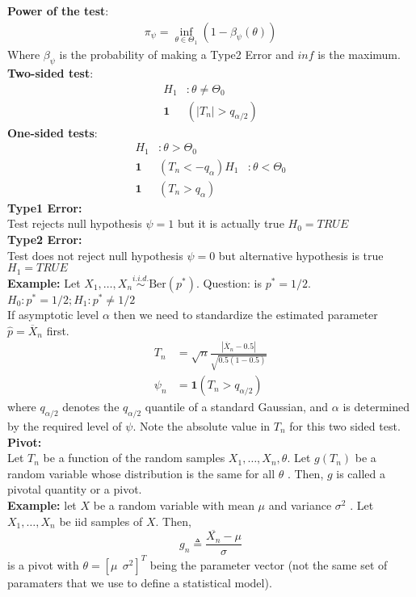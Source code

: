 \textbf{Power of the test}:\\
\begin{align*}
\pi_\psi = \inf_{\theta \in \Theta_1}(1 - \beta_\psi(\theta))
\end{align*}
Where $\beta_\psi$ is the probability of making a Type2 Error and $inf$ is the maximum.\\
\textbf{Two-sided test}:
\begin{align*}
H_1&: \theta \neq \Theta_0\\
\mathbf{1}&(|T_ n| > q_{\alpha /2})
\end{align*}
\textbf{One-sided tests}:
\begin{align*}
H_1&: \theta > \Theta_0\\
\mathbf{1}&(T_ n < -q_{\alpha})
H_1&: \theta < \Theta_0\\
\mathbf{1}&(T_ n > q_{\alpha})
\end{align*}
\textbf{Type1 Error:}\\
Test rejects null hypothesis $\psi = 1$ but it is actually true $H_0 = TRUE$\\
\textbf{Type2 Error:}\\
Test does not reject null hypothesis $\psi = 0$ but alternative hypothesis is true $H_1 = TRUE$\\
\textbf{Example:} Let $X_1, \ldots , X_ n \stackrel{i.i.d.}{\sim } \text {Ber}(p^*)$. Question: is $p^* = 1/2$.\\
$H_0: p^* = 1/2; H_1:p^* \neq 1/2$\\
If asymptotic level $\alpha$ then we need to standardize the estimated parameter $\hat{p} = \overline{X}_ n$ first.\\
\begin{align*}
T_n &= \sqrt{n}\frac{\left| \overline{X}_ n - 0.5\right|}{\sqrt{0.5(1 - 0.5)}}\\
\displaystyle \psi _{n} &= \displaystyle \mathbf{1}\left(T_n>q_{\alpha /2} \right)
\end{align*}
where $q_{\alpha /2}$ denotes the $q_{\alpha /2}$ quantile of a standard Gaussian, and $\alpha$ is determined by the required level of $\psi$. Note the absolute value in $T_n$ for this two sided test.\\
\textbf{Pivot:}\\
Let $T_n$ be a function of the random samples $X_1,\dots ,X_ n,\theta$. Let $g(T_ n)$ be a random variable whose distribution is the same for all $\theta$ . Then, $g$ is called a pivotal quantity or a pivot.\\
\textbf{Example:} let $X$ be a random variable with mean $\mu$ and variance $\sigma^2$ . Let $X_1,\dots ,X_ n$ be iid samples of $X$. Then,
\[\displaystyle  g_ n \triangleq \frac{\overline{X_ n} - \mu }{\sigma }\]
is a pivot with $\theta = \left[\mu ~ ~  \sigma ^2\right]^ T$ being the parameter vector (not the same set of paramaters that we use to define a statistical model).
